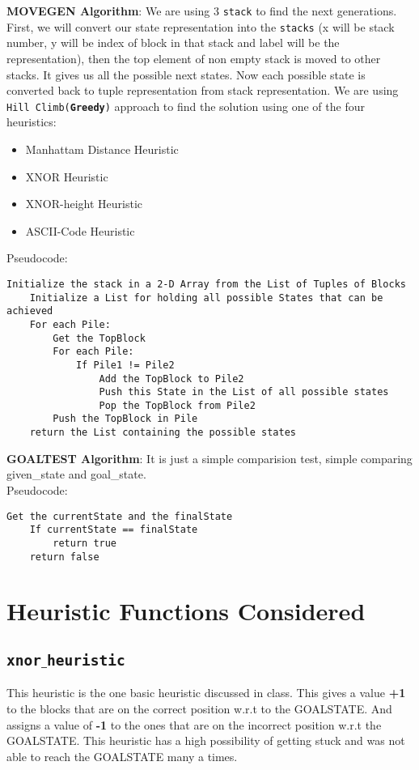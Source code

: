 \documentclass[a4paper,10pt,reqno,oneside]{amsart}
\begin{document}
\textbf{MOVEGEN Algorithm}: We are using 3 \texttt{stack} to find the next generations. First, we will convert 
our state representation into the \texttt{stacks} (x will be stack number, y  will be index of block in that stack and label will 
be the representation), then the top element of non empty stack is moved to other stacks. It gives us all the possible next states. 
Now each possible state is converted back to tuple representation from stack representation. We are using 
\texttt{Hill Climb(\textbf{Greedy})} approach to find the solution using one of the four heuristics:
\begin{itemize}
    \item Manhattam Distance Heuristic
    \item XNOR Heuristic
    \item XNOR-height Heuristic
    \item ASCII-Code Heuristic
\end{itemize}
Pseudocode:
\begin{lstlisting}[frame=single]
    Initialize the stack in a 2-D Array from the List of Tuples of Blocks
    Initialize a List for holding all possible States that can be achieved
    For each Pile:
        Get the TopBlock
        For each Pile:
            If Pile1 != Pile2
                Add the TopBlock to Pile2
                Push this State in the List of all possible states
                Pop the TopBlock from Pile2
        Push the TopBlock in Pile
    return the List containing the possible states
\end{lstlisting}



\textbf{GOALTEST Algorithm}: It is just a simple comparision test, simple 
comparing given\_state and goal\_state.\\
Pseudocode:
\begin{lstlisting}[frame=single]
    Get the currentState and the finalState
    If currentState == finalState
        return true
    return false
\end{lstlisting}
\section{Heuristic Functions Considered}
\subsection*{\texttt{xnor$\_$heuristic}}
This heuristic is the one basic heuristic discussed in class. This gives a value \textbf{+1}
to the blocks that are on the correct position w.r.t to the GOALSTATE. And assigns a value of 
\textbf{-1} to the ones that are on the incorrect position w.r.t the GOALSTATE.
\newline
This heuristic has a high possibility of getting stuck and was not able to reach the GOALSTATE many a times.
\end{document}
